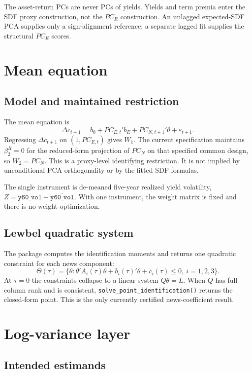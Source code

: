 \documentclass[11pt]{article}
\newcommand{\ThetaSet}{\Theta(\tau)}
\begin{document}
The asset-return PCs are never PCs of yields. Yields and term premia enter the
SDF proxy construction, not the $PC_R$ construction. An unlagged expected-SDF
PCA supplies only a sign-alignment reference; a separate lagged fit supplies
the structural $PC_E$ scores.

\section{Mean equation}

\subsection{Model and maintained restriction}

The mean equation is
\[
  \Delta c_{t+1}
  = b_0+PC_{E,t}'b_E+PC_{N,t+1}'\theta+\varepsilon_{t+1}.
\]
Regressing $\Delta c_{t+1}$ on $(1,PC_{E,t})$ gives $W_1$. The current
specification maintains $\beta_2^R=0$ for the reduced-form projection of
$PC_N$ on that specified common design, so $W_2=PC_N$. This is a
proxy-level identifying restriction. It is not implied by unconditional PCA
orthogonality or by the fitted SDF formulas.

The single instrument is de-meaned five-year realized yield volatility,
$Z=\texttt{y60\_vol}-\overline{\texttt{y60\_vol}}$. With one instrument,
the weight matrix is fixed and there is no weight optimization.

\subsection{Lewbel quadratic system}

The package computes the identification moments and returns one quadratic
constraint for each news component:
\[
  \ThetaSet
  =\{\theta:\theta'A_i(\tau)\theta+b_i(\tau)'\theta+c_i(\tau)\leq0,
    \ i=1,2,3\}.
\]
At $\tau=0$ the constraints collapse to a linear system $Q\theta=L$. When
$Q$ has full column rank and is consistent,
\texttt{solve\_point\_identification()} returns the closed-form point. This
is the only currently certified news-coefficient result.

\section{Log-variance layer}

\subsection{Intended estimands}
\end{document}
